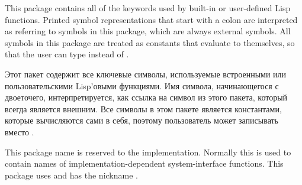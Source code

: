 \begin{flushdesc}
\item[\cdf{keyword}]
This package contains all of the keywords used by built-in
or user-defined Lisp functions.  Printed symbol representations
that start with a colon are interpreted as referring to symbols
in this package, which are always external symbols.  All symbols in this
package are treated as constants that evaluate to themselves, so that the
user can type  instead of .

Этот пакет содержит все ключевые символы, используемые встроенными или
пользовательскими Lisp'овыми функциями. Имя символа, начинающегося с двоеточего,
интерпретируется, как ссылка на символ из этого пакета, который всегда является
внешним. Все символы в этом пакете является константами, которые вычисляются
сами в себя, поэтому пользователь может записывать  вместо .
\end{flushdesc}

\begin{obsolete}
\begin{flushdesc}
\item[\cdf{system}]
This package name is reserved to the implementation.
Normally this is used to contain names of implementation-dependent
system-interface functions.  This package uses  and has the
nickname . 
\end{flushdesc}
\end{obsolete}

